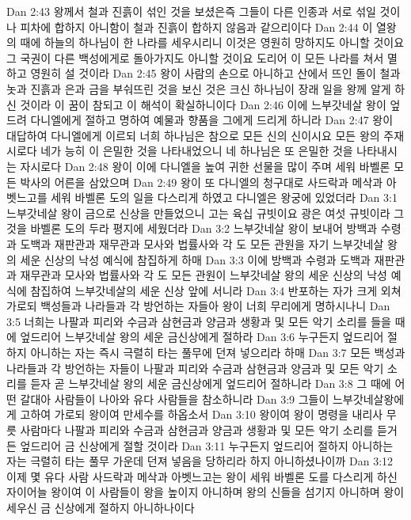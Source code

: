 Dan 2:43  왕께서 철과 진흙이 섞인 것을 보셨은즉 그들이 다른 인종과 서로 섞일 것이나 피차에 합하지 아니함이 철과 진흙이 합하지 않음과 같으리이다
Dan 2:44  이 열왕의 때에 하늘의 하나님이 한 나라를 세우시리니 이것은 영원히 망하지도 아니할 것이요 그 국권이 다른 백성에게로 돌아가지도 아니할 것이요 도리어 이 모든 나라를 쳐서 멸하고 영원히 설 것이라
Dan 2:45  왕이 사람의 손으로 아니하고 산에서 뜨인 돌이 철과 놋과 진흙과 은과 금을 부숴뜨린 것을 보신 것은 크신 하나님이 장래 일을 왕께 알게 하신 것이라 이 꿈이 참되고 이 해석이 확실하니이다
Dan 2:46  이에 느부갓네살 왕이 엎드려 다니엘에게 절하고 명하여 예물과 향품을 그에게 드리게 하니라
Dan 2:47  왕이 대답하여 다니엘에게 이르되 너희 하나님은 참으로 모든 신의 신이시요 모든 왕의 주재시로다 네가 능히 이 은밀한 것을 나타내었으니 네 하나님은 또 은밀한 것을 나타내시는 자시로다
Dan 2:48  왕이 이에 다니엘을 높여 귀한 선물을 많이 주며 세워 바벨론 모든 박사의 어른을 삼았으며
Dan 2:49  왕이 또 다니엘의 청구대로 사드락과 메삭과 아벳느고를 세워 바벨론 도의 일을 다스리게 하였고 다니엘은 왕궁에 있었더라
Dan 3:1  느부갓네살 왕이 금으로 신상을 만들었으니 고는 육십 규빗이요 광은 여섯 규빗이라 그것을 바벨론 도의 두라 평지에 세웠더라
Dan 3:2  느부갓네살 왕이 보내어 방백과 수령과 도백과 재판관과 재무관과 모사와 법률사와 각 도 모든 관원을 자기 느부갓네살 왕의 세운 신상의 낙성 예식에 참집하게 하매
Dan 3:3  이에 방백과 수령과 도백과 재판관과 재무관과 모사와 법률사와 각 도 모든 관원이 느부갓네살 왕의 세운 신상의 낙성 예식에 참집하여 느부갓네살의 세운 신상 앞에 서니라
Dan 3:4  반포하는 자가 크게 외쳐 가로되 백성들과 나라들과 각 방언하는 자들아 왕이 너희 무리에게 명하시나니
Dan 3:5  너희는 나팔과 피리와 수금과 삼현금과 양금과 생황과 및 모든 악기 소리를 들을 때에 엎드리어 느부갓네살 왕의 세운 금신상에게 절하라
Dan 3:6  누구든지 엎드리어 절하지 아니하는 자는 즉시 극렬히 타는 풀무에 던져 넣으리라 하매
Dan 3:7  모든 백성과 나라들과 각 방언하는 자들이 나팔과 피리와 수금과 삼현금과 양금과 및 모든 악기 소리를 듣자 곧 느부갓네살 왕의 세운 금신상에게 엎드리어 절하니라
Dan 3:8  그 때에 어떤 갈대아 사람들이 나아와 유다 사람들을 참소하니라
Dan 3:9  그들이 느부갓네살왕에게 고하여 가로되 왕이여 만세수를 하옵소서
Dan 3:10  왕이여 왕이 명령을 내리사 무릇 사람마다 나팔과 피리와 수금과 삼현금과 양금과 생황과 및 모든 악기 소리를 듣거든 엎드리어 금 신상에게 절할 것이라
Dan 3:11  누구든지 엎드리어 절하지 아니하는 자는 극렬히 타는 풀무 가운데 던져 넣음을 당하리라 하지 아니하셨나이까
Dan 3:12  이제 몇 유다 사람 사드락과 메삭과 아벳느고는 왕이 세워 바벨론 도를 다스리게 하신 자이어늘 왕이여 이 사람들이 왕을 높이지 아니하며 왕의 신들을 섬기지 아니하며 왕이 세우신 금 신상에게 절하지 아니하나이다
